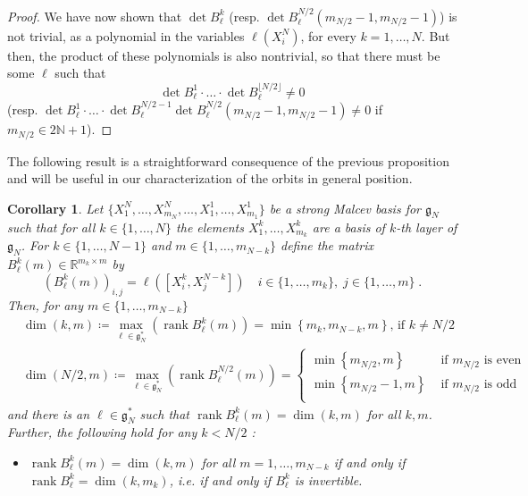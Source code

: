 \documentclass[pdflatex,sn-mathphys-num]{sn-jnl}
\theoremstyle{thmstyletwo}
\theoremstyle{thmstyleone}
\newtheorem{corollary}[definition]{Corollary}
\theoremstyle{thmstyletwo}
\newcommand{\fancyg}{\mathfrak{g}}
\newcommand{\rank}{\operatorname{rank}}
\begin{document}
\begin{proof}
		\noindent We have now shown that $\det B_{\ell}^k$ (resp. $\det B_{\ell}^{N/2}(m_{N/2}-1,m_{N/2}-1)$) is not trivial, as a polynomial in the variables $\ell(X_i^N)$, for every $k=1, \ldots, N$. But then, the product of these polynomials is also nontrivial, so that there must be some $\ell$ such that 
		\begin{equation*}
			\det B_{\ell}^1 \cdot \ldots \cdot \det B_{\ell}^{\lfloor N/2\rfloor} \neq 0
		\end{equation*}
		(resp. $\det B_{\ell}^1 \cdot \ldots \cdot \det B_{\ell}^{N/2-1} \det B_{\ell}^{N/2}(m_{N/2}-1,m_{N/2}-1)\neq 0$ if $m_{N/2} \in 2\mathbb{N}+1$).
	\end{proof}
	The following result is a straightforward consequence of the previous proposition and will be useful in our characterization of the orbits in general position.
	\begin{corollary}\label{cor: max rank of blm}
		Let $\{X_1^N, \ldots, X_{m_N}^N, \ldots,X_1^1, \ldots, X_{m_1}^1\}$ be a strong Malcev basis for $\fancyg_N$ such that for all $k \in \{1, \ldots, N\}$ the elements $X_1^k, \ldots, X_{m_k}^k$ are a basis of $k$-th layer of $\fancyg_N$. For $k \in \{1,\ldots, N-1\}$ and $m \in \{1,\ldots,m_{N-k}\}$ define the matrix $B_{\ell}^k(m) \in \mathbb{R}^{m_k\times m}$ by
		\[(B_{\ell}^k(m))_{i,j} = \ell([X_i^k,X_j^{N-k}]) \quad i \in \{1, \ldots, m_k\}, \;j \in \{1, \ldots, m\} \;.\]
		Then, for any $m \in \{1, \ldots, m_{N-k}\}$
		\begin{align*}
			&\operatorname{dim}(k,m) \coloneqq \max_{\ell \in \fancyg_{N}^*}\left(\operatorname{rank}B_{\ell}^k(m)\right)=
			\min\left\{m_k,m_{N-k},m\right\} \text{, if } k \neq N/2\\
			&\operatorname{dim}(N/2,m) \coloneqq \max_{\ell \in \fancyg_{N}^*}\left(\operatorname{rank}B_{\ell}^{N/2}(m)\right) = \begin{cases}
				\min\left\{m_{N/2},m\right\} &\text{ if } m_{N/2} \text{ is even}\\
				\min\left\{m_{N/2}-1,m\right\} &\text{ if } m_{N/2} \text{ is odd}\\
			\end{cases}
		\end{align*}
		and there is an $\ell \in \fancyg_{N}^*$ such that $\operatorname{rank}B_{\ell}^k(m) = \dim(k,m)$ for all $k,m$.\\
		Further, the following hold for any $k < N/2$ :
		\begin{itemize}
			\item[i)] $\operatorname{rank}B_{\ell}^k(m) = \dim(k,m)$ for all $m = 1, \ldots, m_{N-k}$ if and only if $\rank B_{\ell}^k = \dim(k,m_k)$, i.e. if and only if $B_{\ell}^k$ is invertible.

\end{itemize}
\end{corollary}
\end{document}
